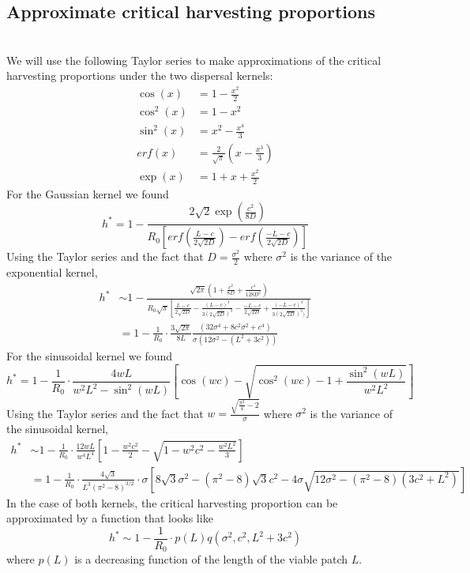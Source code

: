 \documentclass[12pt,english]{article}
\begin{document}
\subsection{Approximate critical harvesting proportions \label{approxcrit}}
~\\We will use the following Taylor series to make approximations of the critical harvesting proportions under the two dispersal kernels:
\begin{align*}
\cos(x)&=1-\frac{x^2}{2}
\\ \cos^2(x)&=1-x^2
\\ \sin^2(x)&=x^2-\frac{x^4}{3}
\\ erf(x)&=\frac{2}{\sqrt{\pi}}(x-\frac{x^3}{3})
\\ \exp(x)&=1+x+\frac{x^2}{2}
\end{align*}
For the Gaussian kernel we found 
\begin{equation}
h^*=1-\frac{2\sqrt{2}\exp\left(\frac{c^{2}}{8D}\right)}{R_0\left[erf\left(\frac{L-c}{2\sqrt{2D}}\right)-erf\left(\frac{-L-c}{2\sqrt{2D}}\right)\right]}
\end{equation} 
Using the Taylor series and the fact that $D=\frac{\sigma^2}{2}$ where $\sigma^2$ is the variance of the exponential kernel,
\begin{align*}
h^*&\sim 1-\frac{\sqrt{2\pi}(1+\frac{c^2}{8D}+\frac{c^4}{128D^2})}{R_0\sqrt{\pi}\left[\frac{L-c}{2\sqrt{2D}}-\frac{(L-c)^3}{3(2\sqrt{2D})^3}-\frac{-L-c}{2\sqrt{2D}}+\frac{(-L-c)^3}{3(2\sqrt{2D})^3)}\right]}
\\&= 1-\frac{1}{R_0}\cdot\frac{3\sqrt{2\pi}}{8L}\frac{(32\sigma^4+8c^2\sigma^2+c^4)}{\sigma\left(12\sigma^2-(L^2+3c^2)\right)}
\end{align*}
For the sinusoidal kernel we found 
\begin{equation}
h^*=1-\frac{1}{R_0}\cdot\frac{4wL}{w^2L^2-\sin^2(wL)}\left[\cos(wc)-\sqrt{\cos^2(wc)-1+\frac{\sin^2(wL)}{w^2L^2}}\right] 
\end{equation} 
Using the Taylor series and the fact that $w=\frac{\sqrt{\frac{\pi^2}{4}-2}}{\sigma}$ where $\sigma^2$ is the variance of the sinusoidal kernel,
\begin{align*}
h^*&\sim 1-\frac{1}{R_0}\cdot\frac{12wL}{w^4L^4}\left[1-\frac{w^2c^2}{2}-\sqrt{1-w^2c^2-\frac{w^2L^2}{3}}\right]
\\&=1-\frac{1}{R_0}\cdot\frac{4\sqrt{3}}{L^3(\pi^2-8)^{3/2}}\cdot\sigma\left[8\sqrt{3}\sigma^2-(\pi^2-8)\sqrt{3}c^2-4\sigma\sqrt{12\sigma^2-(\pi^2-8)(3c^2+L^2)}\right]
\end{align*}
In the case of both kernels, the critical harvesting proportion can be approximated by a function that looks like 
\begin{equation}
h^*\sim1- \frac{1}{R_0}\cdot p(L)q(\sigma^2,c^2,L^2+3c^2)
\end{equation}
where $p(L)$ is a decreasing function of the length of the viable patch $L$.
\end{document}
